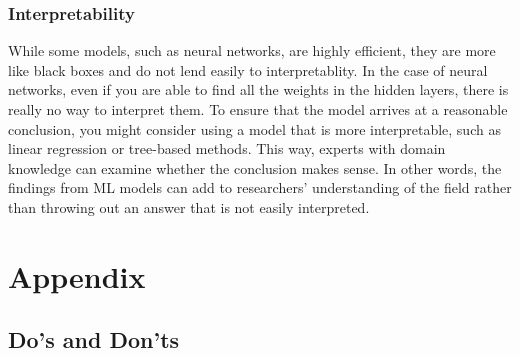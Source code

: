 \documentclass[
]{book}
\begin{document}
\hypertarget{interpretability}{%
\subsection{Interpretability}\label{interpretability}}

While some models, such as neural networks, are highly efficient, they are more like black boxes and do not lend easily to interpretablity. In the case of neural networks, even if you are able to find all the weights in the hidden layers, there is really no way to interpret them. To ensure that the model arrives at a reasonable conclusion, you might consider using a model that is more interpretable, such as linear regression or tree-based methods. This way, experts with domain knowledge can examine whether the conclusion makes sense. In other words, the findings from ML models can add to researchers' understanding of the field rather than throwing out an answer that is not easily interpreted.

\hypertarget{appendix}{%
\chapter{Appendix}\label{appendix}}

\hypertarget{dos-and-donts}{%
\section{Do's and Don'ts}\label{dos-and-donts}}

  
\end{document}
